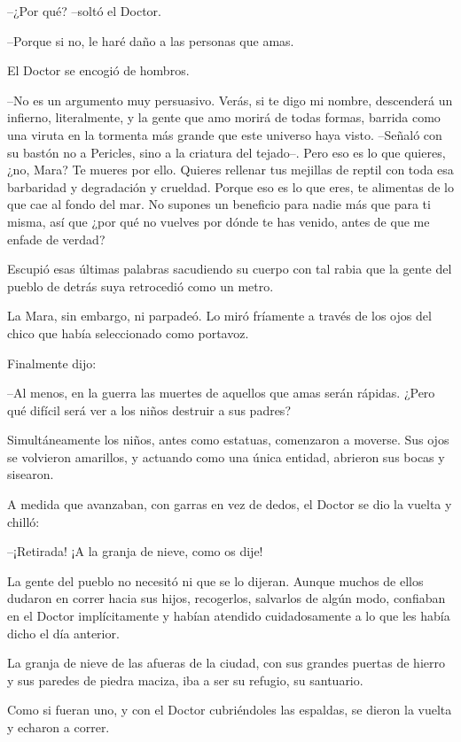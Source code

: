 --¿Por qué? --soltó el Doctor.

--Porque si no, le haré daño a las personas que amas.

El Doctor se encogió de hombros.

--No es un argumento muy persuasivo. Verás, si te digo mi nombre, descenderá un infierno, literalmente, y la gente que amo morirá de todas formas, barrida como una viruta en la tormenta más grande que este universo haya visto. --Señaló con su bastón no a Pericles, sino a la criatura del tejado--. Pero eso es lo que quieres, ¿no, Mara? Te mueres por ello. Quieres rellenar tus mejillas de reptil con toda esa barbaridad y degradación y crueldad. Porque eso es lo que eres, te alimentas de lo que cae al fondo del mar. No supones un beneficio para nadie más que para ti misma, así que ¿por qué no vuelves por dónde te has venido, antes de que me enfade de verdad?

Escupió esas últimas palabras sacudiendo su cuerpo con tal rabia que la gente del pueblo de detrás suya retrocedió como un metro.

La Mara, sin embargo, ni parpadeó. Lo miró fríamente a través de los ojos del chico que había seleccionado como portavoz.

Finalmente dijo:

--Al menos, en la guerra las muertes de aquellos que amas serán rápidas. ¿Pero qué difícil será ver a los niños destruir a sus padres?

Simultáneamente los niños, antes como estatuas, comenzaron a moverse. Sus ojos se volvieron amarillos, y actuando como una única entidad, abrieron sus bocas y sisearon.

A medida que avanzaban, con garras en vez de dedos, el Doctor se dio la vuelta y chilló:

--¡Retirada! ¡A la granja de nieve, como os dije!

La gente del pueblo no necesitó ni que se lo dijeran. Aunque muchos de ellos dudaron en correr hacia sus hijos, recogerlos, salvarlos de algún modo, confiaban en el Doctor implícitamente y habían atendido cuidadosamente a lo que les había dicho el día anterior.

La granja de nieve de las afueras de la ciudad, con sus grandes puertas de hierro y sus paredes de piedra maciza, iba a ser su refugio, su santuario.

Como si fueran uno, y con el Doctor cubriéndoles las espaldas, se dieron la vuelta y echaron a correr.

